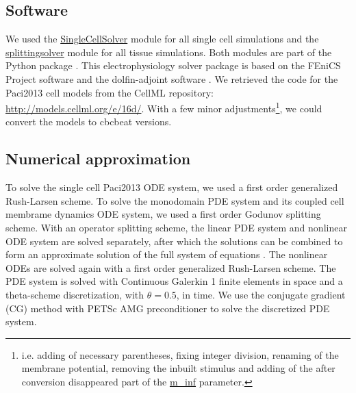 \documentclass{article}
\begin{document}
\subsection{Software} \label{Software}
We used the \url{SingleCellSolver} module for all single cell simulations and the \url{splittingsolver} module for all tissue simulations. Both modules are part of the Python package \cite{cbcbeat}. This electrophysiology solver package is based on the FEniCS Project software \cite{fenics} and the dolfin-adjoint software \cite{dolfin-adjoint}. We retrieved the code for the Paci2013 cell models from the CellML repository: \url{http://models.cellml.org/e/16d/}. With a few minor adjustments\footnote{i.e. adding of necessary parentheses, fixing integer division, renaming of the membrane potential, removing the inbuilt stimulus and adding of the after conversion disappeared part of the \url{m_inf} parameter.}, we could convert the models to cbcbeat versions. 
%
\subsection{Numerical approximation} \label{Numerical approximation}
To solve the single cell Paci2013 ODE system, we used a first order generalized Rush-Larsen scheme. To solve the monodomain PDE system and its coupled cell membrame dynamics ODE system, we used a first order Godunov splitting scheme. With an operator splitting scheme, the linear PDE system and nonlinear ODE system are solved separately, after which the solutions can be combined to form an approximate solution of the full system of equations \cite{Sundnes}. The nonlinear ODEs are solved again with a first order generalized Rush-Larsen scheme. The PDE system is solved with Continuous Galerkin 1 finite elements in space and a theta-scheme discretization, with $\theta=0.5$, in time. We use the conjugate gradient (CG) method with PETSc AMG preconditioner to solve the discretized PDE system. 
%
\end{document}
